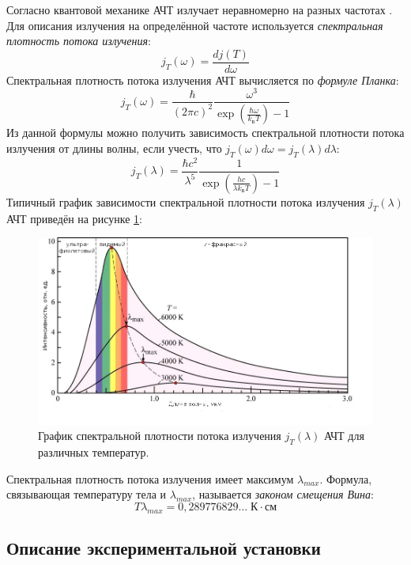 \documentclass[10pt,a4paper]{article}
\begin{document}
\begin{multicols}{2}
	Согласно квантовой механике АЧТ излучает неравномерно на разных частотах \cite[гл.~X]{Sivukhin4}. Для описания излучения на определённой частоте используется \textit{спектральная плотность потока излучения}:
	$$
	j_T(\omega) = \frac{d j(T)}{d \omega}
	$$
	Спектральная плотность потока излучения АЧТ вычисляется по \textit{формуле Планка}:
	$$
	j_T(\omega) = \frac{\hbar}{\left(2 \pi c \right)^2} \frac{\omega^3}{\exp \left(\frac{\hbar \omega}{k_Б T}\right) - 1}
	$$
	Из данной формулы можно получить зависимость спектральной плотности потока излучения от длины волны, если учесть, что $j_T(\omega) d\omega = j_T(\lambda) d\lambda$:
	$$
	j_T(\lambda) = \frac{\hbar c^2}{\lambda^5}  \frac{1}{\exp \left(\frac{h c}{\lambda k_Б T}\right) - 1}
	$$
	Типичный график зависимости спектральной плотности потока излучения $j_T(\lambda)$ АЧТ приведён на рисунке \ref{img:j_T(lambda)}:
	\begin{figure}[H]
		\centering
		\includegraphics[width=1\textwidth]{images/j_t(lambda).jpg}
		\caption{График спектральной плотности потока излучения $j_T(\lambda)$ АЧТ для различных температур.}
		\label{img:j_T(lambda)}
	\end{figure}
	Спектральная плотность потока излучения имеет максимум $\lambda_{max}$. Формула, связывающая температуру тела и $\lambda_{max}$, называется \textit{законом смещения Вина}:
	$$
	T \lambda_{max} = 0,289776829 \dots \; К \cdot см
	$$
	
	\subsection*{Описание экспериментальной установки}
	

\end{multicols}
\end{document}
